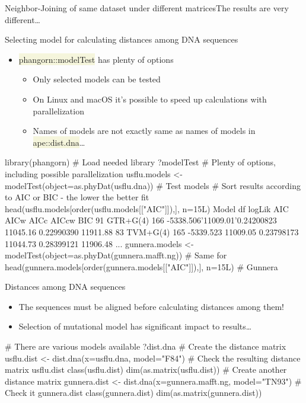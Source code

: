 \documentclass[compress, xelatex, 11pt, xcolor=svgnames, aspectratio=169,
	hyperref={
		bookmarks=true,
		unicode=true,
		colorlinks=true,
		pdftitle={Molecular data in R},
		plainpages=false,
		pdfauthor={Vojtech Zeisek},
		pdfsubject={Course about phylogeny and evolution in R},
		pdfcreator={XeLaTeX},
		pdfkeywords={R, evolution, phylogeny, molecular data},
		linkcolor=Crimson, %
		anchorcolor=Magenta, %
		citecolor=Magenta, %
		filecolor=Magenta, %
		menucolor=Magenta, %
		urlcolor=DodgerBlue, %
		},
	url={hyphens, lowtilde} %
	]{beamer}
\renewcommand{\texttt}[1]{\colorbox{Beige}{{\ttfamily #1}}}
\begin{document}
\begin{frame}{Neighbor-Joining of same dataset under different matrices}{The results are very different\ldots}
	\begin{center}
		\texttt{[image: distances.png]}
	\end{center}
\end{frame}

\begin{frame}[fragile]{Selecting model for calculating distances among DNA sequences}
	\begin{itemize}
		\item \texttt{phangorn::modelTest} has plenty of options
		\begin{itemize}
			\item Only selected models can be tested
			\item On Linux and macOS it's possible to speed up calculations with parallelization
			\item Names of models are not exactly same as names of models in \texttt{ape::dist.dna}\ldots
		\end{itemize}
	\end{itemize}
	\begin{spluscode}
    library(phangorn) # Load needed library
    ?modelTest # Plenty of options, including possible parallelization
    usflu.models <- modelTest(object=as.phyDat(usflu.dna)) # Test models
    # Sort results according to AIC or BIC - the lower the better fit
    head(usflu.models[order(usflu.models[["AIC"]]),], n=15L)
          Model  df    logLik      AIC       AICw     AICc      AICcw      BIC
    91 GTR+G(4) 166 -5338.506'11009.01'0.24200823 11045.16 0.22990390 11911.88
    83 TVM+G(4) 165 -5339.523 11009.05 0.23798173 11044.73 0.28399121 11906.48
    ...
    gunnera.models <- modelTest(object=as.phyDat(gunnera.mafft.ng)) # Same for
    head(gunnera.models[order(gunnera.models[["AIC"]]),], n=15L)    # Gunnera
	\end{spluscode}
\end{frame}

\begin{frame}[fragile]{Distances among DNA sequences}
	\begin{itemize}
		\item \alert{The sequences must be aligned before calculating distances among them!}
		\item Selection of mutational model has significant impact to results\ldots
	\end{itemize}
	\vfill
	\begin{spluscode}
    # There are various models available
    ?dist.dna
    # Create the distance matrix
    usflu.dist <- dist.dna(x=usflu.dna, model="F84")
    # Check the resulting distance matrix
    usflu.dist
    class(usflu.dist)
    dim(as.matrix(usflu.dist))
    # Create another distance matrix
    gunnera.dist <- dist.dna(x=gunnera.mafft.ng, model="TN93")
    # Check it
    gunnera.dist
    class(gunnera.dist)
    dim(as.matrix(gunnera.dist))
	\end{spluscode}
\end{frame}
\end{document}
